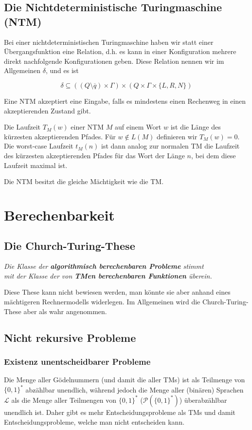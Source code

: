 \documentclass[a4paper,parskip=half*,DIV=7,fontsize=11pt]{scrartcl}
\begin{document}
\subsection{Die Nichtdeterministische Turingmaschine (NTM)}
Bei einer nichtdeterministischen Turingmaschine haben wir statt einer Übergangsfunktion eine Relation, d.h. es kann in einer Konfiguration mehrere direkt nachfolgende Konfigurationen geben. Diese Relation nennen wir im Allgemeinen $\delta$, und es ist

\[\delta \subseteq ((Q \setminus \overline q) \times \Gamma) \times (Q\times \Gamma \times \{L,R,N\})\]

Eine NTM akzeptiert eine Eingabe, falls es mindestens einen Rechenweg in einen akzeptierenden Zustand gibt.

Die Laufzeit $T_M(w)$ einer NTM $M$ auf einem Wort $w$ ist die Länge des kürzesten akzeptierenden Pfades. Für $w \notin L(M)$ definieren wir $T_M(w) = 0$. Die worst-case Laufzeit $t_M(n)$ ist dann analog zur normalen TM die Laufzeit des kürzesten akzeptierenden Pfades für das Wort der Länge $n$, bei dem diese Laufzeit maximal ist.

Die NTM  besitzt die gleiche Mächtigkeit wie die TM.

\section{Berechenbarkeit}
\subsection{Die Church-Turing-These}
\label{sec:church-turing}
\begin{center}
\textit{Die Klasse der \textbf{algorithmisch berechenbaren Probleme} stimmt \\ mit der Klasse der von \textbf{TMen berechenbaren Funktionen} überein.} 
\end{center} 
Diese These kann nicht bewiesen werden, man könnte sie aber anhand eines mächtigeren Rechnermodells widerlegen. Im Allgemeinen wird die Church-Turing-These aber als wahr angenommen.

\subsection{Nicht rekursive Probleme}
\subsubsection{Existenz unentscheidbarer Probleme}
Die Menge aller Gödelnummern (und damit die aller TMs) ist als Teilmenge von $\{0,1\}^*$ abzählbar unendlich, während jedoch die Menge aller (binären) Sprachen $\mathcal L$ als die Menge aller Teilmengen von $\{0,1\}^*$ ($\mathcal P (\{0,1\}^*)$)  überabzählbar unendlich ist. Daher gibt es  mehr Entscheidungsprobleme als TMs und damit Entscheidungsprobleme, welche man nicht entscheiden kann.
\end{document}

